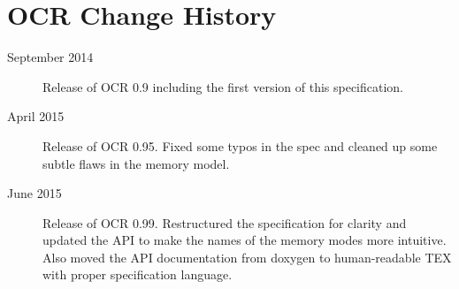 %

\chapter{OCR Change  History}
\label{chap:OCR Change History}
\label{chap:Appendix D}
\begin{description}
\item[September 2014] Release of OCR 0.9 including the first version
  of this specification.
\item[April 2015] Release of OCR 0.95.  Fixed some typos in the spec and
cleaned up some subtle flaws in the memory model.
\item[June 2015] Release of OCR 0.99. Restructured the specification for clarity and
updated the API to make the names of the memory modes more intuitive.  Also moved
the API documentation from doxygen to human-readable TEX with proper specification
language.
\end{description}

